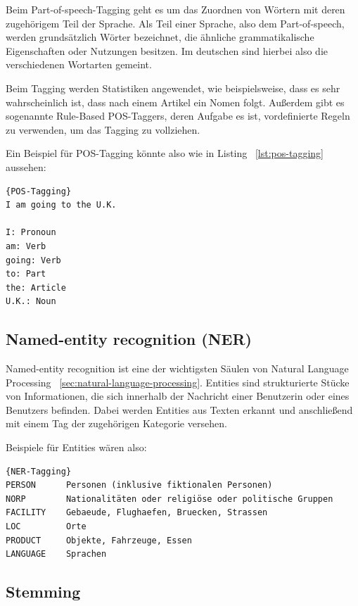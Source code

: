 Beim Part-of-speech-Tagging geht es um das Zuordnen von Wörtern mit deren zugehörigem Teil der Sprache.
Als Teil einer Sprache, also dem Part-of-speech, werden grundsätzlich Wörter bezeichnet, die ähnliche grammatikalische Eigenschaften oder Nutzungen besitzen.
Im deutschen sind hierbei also die verschiedenen Wortarten gemeint.

Beim Tagging werden Statistiken angewendet, wie beispielsweise, dass es sehr wahrscheinlich ist, dass nach einem Artikel ein Nomen folgt.
Außerdem gibt es sogenannte Rule-Based POS-Taggers, deren Aufgabe es ist, vordefinierte Regeln zu verwenden, um das Tagging zu vollziehen.\cite{machineLearningTextAnalysis, naturalLanguageProcessing}

Ein Beispiel für POS-Tagging könnte also wie in Listing ~\ref{lst:pos-tagging} aussehen:

\begin{lstlisting}[label={lst:pos-tagging},caption={Beispiel für POS-Tagging}]{POS-Tagging}
I am going to the U.K.

I: Pronoun
am: Verb
going: Verb
to: Part
the: Article
U.K.: Noun
\end{lstlisting}

\subsection{Named-entity recognition (NER)}\label{subsec:ner}

Named-entity recognition ist eine der wichtigsten Säulen von Natural Language Processing ~\ref{sec:natural-language-processing}.
Entities sind strukturierte Stücke von Informationen, die sich innerhalb der Nachricht einer Benutzerin oder eines Benutzers befinden.
Dabei werden Entities aus Texten erkannt und anschließend mit einem Tag der zugehörigen Kategorie versehen.\cite{namedEntityRecognition}

Beispiele für Entities wären also:

\begin{lstlisting}[label={lst:ner-tagging},caption={Beispiele für Enitites}]{NER-Tagging}
PERSON      Personen (inklusive fiktionalen Personen)
NORP        Nationalitäten oder religiöse oder politische Gruppen
FACILITY    Gebaeude, Flughaefen, Bruecken, Strassen
LOC         Orte
PRODUCT     Objekte, Fahrzeuge, Essen
LANGUAGE    Sprachen
\end{lstlisting}

\subsection{Stemming}\label{subsec:stemming}


